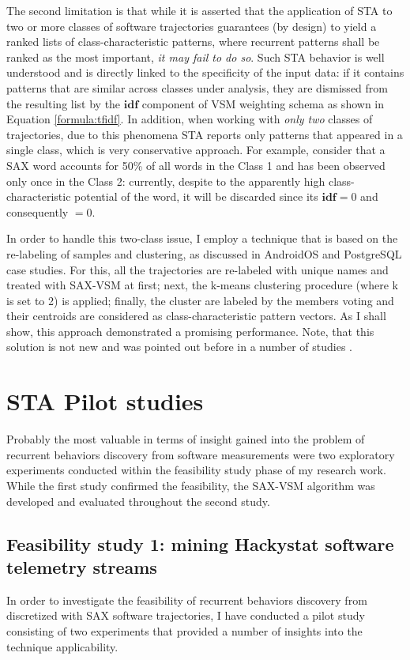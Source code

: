 The second limitation is that while it is asserted that the application of STA to two or more classes of software trajectories guarantees (by design) to yield a ranked lists of class-characteristic patterns, where recurrent patterns shall be ranked as the most important, \textit{it may fail to do so}. Such STA behavior is well understood and is directly linked to the specificity of the input data: if it contains patterns that are similar across classes under analysis, they are dismissed from the resulting list by the $\textbf{idf}$ component of VSM weighting schema as shown in Equation \eqref{formula:tfidf}. In addition, when working with \textit{only two} classes of trajectories, due to this phenomena STA reports only patterns that appeared in a single class, which is very conservative approach. For example, consider that a SAX word accounts for 50\% of all words in the Class 1 and has been observed only once in the Class 2: currently, despite to the apparently high class-characteristic potential of the word, it will be discarded since its $\textbf{idf}=0$ and consequently \tfidf$=0$.

In order to handle this two-class issue, I employ a technique that is based on the re-labeling of samples and clustering, as discussed in AndroidOS and PostgreSQL case studies. For this, all the trajectories are re-labeled with unique names and treated with SAX-VSM at first; next, the k-means clustering procedure (where k is set to 2) is applied; finally, the cluster are labeled by the members voting and their centroids are considered as class-characteristic pattern vectors. As I shall show, this approach demonstrated a promising performance. Note, that this solution is not new and was pointed out before in a number of studies \cite{classification_centroids} \cite{salton-71} \cite{intro_ir_Manning}.

\section{STA Pilot studies}
Probably the most valuable in terms of insight gained into the problem of recurrent behaviors discovery from software measurements were two exploratory experiments conducted within the feasibility study phase of my research work. While the first study confirmed the feasibility, the SAX-VSM algorithm was developed and evaluated throughout the second study.

\subsection{Feasibility study 1: mining Hackystat software telemetry streams}
In order to investigate the feasibility of recurrent behaviors discovery from discretized with SAX \cite{citeulike:2821475} software trajectories, I have conducted a pilot study consisting of two experiments that provided a number of insights into the technique applicability.  

